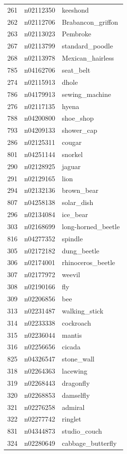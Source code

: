 \begin{table}
\begin{tabular}{cll}
261 & n02112350 & keeshond \\
262 & n02112706 & Brabancon_griffon \\
263 & n02113023 & Pembroke \\
267 & n02113799 & standard_poodle \\
268 & n02113978 & Mexican_hairless \\
785 & n04162706 & seat_belt \\
274 & n02115913 & dhole \\
786 & n04179913 & sewing_machine \\
276 & n02117135 & hyena \\
788 & n04200800 & shoe_shop \\
793 & n04209133 & shower_cap \\
286 & n02125311 & cougar \\
801 & n04251144 & snorkel \\
290 & n02128925 & jaguar \\
291 & n02129165 & lion \\
294 & n02132136 & brown_bear \\
807 & n04258138 & solar_dish \\
296 & n02134084 & ice_bear \\
303 & n02168699 & long-horned_beetle \\
816 & n04277352 & spindle \\
305 & n02172182 & dung_beetle \\
306 & n02174001 & rhinoceros_beetle \\
307 & n02177972 & weevil \\
308 & n02190166 & fly \\
309 & n02206856 & bee \\
313 & n02231487 & walking_stick \\
314 & n02233338 & cockroach \\
315 & n02236044 & mantis \\
316 & n02256656 & cicada \\
825 & n04326547 & stone_wall \\
318 & n02264363 & lacewing \\
319 & n02268443 & dragonfly \\
320 & n02268853 & damselfly \\
321 & n02276258 & admiral \\
322 & n02277742 & ringlet \\
831 & n04344873 & studio_couch \\
324 & n02280649 & cabbage_butterfly \\

\end{tabular}
\end{table}
